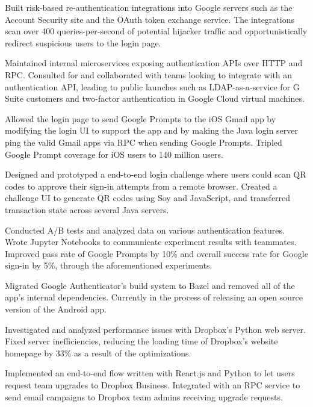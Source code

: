 \documentclass[]{template}
\begin{document}
\hfill
{}
\begin{tightemize}
\item
  Built risk-based re-authentication integrations into Google servers such as
  the Account Security site and the OAuth token exchange service. The
  integrations scan over 400 queries-per-second of potential hijacker traffic
  and opportunistically redirect suspicious users to the login page.
\item
  Maintained internal microservices exposing authentication APIs over HTTP and
  RPC. Consulted for and collaborated with teams looking to integrate with an
  authentication API, leading to public launches such as LDAP-as-a-service for
  G Suite customers and two-factor authentication in Google Cloud virtual
  machines.
\item
  Allowed the login page to send Google Prompts to the iOS Gmail app by
  modifying the login UI to support the app and by making the Java login server
  ping the valid Gmail apps via RPC when sending Google Prompts. Tripled Google
  Prompt coverage for iOS users to 140 million users.
\item
  Designed and prototyped a end-to-end login challenge where users could scan QR
  codes to approve their sign-in attempts from a remote browser. Created a
  challenge UI to generate QR codes using Soy and JavaScript, and transferred
  transaction state across several Java servers.
\item
  Conducted A/B tests and analyzed data on various authentication features.
  Wrote Jupyter Notebooks to communicate experiment results with teammates.
  Improved pass rate of Google Prompts by 10\% and overall success rate for
  Google sign-in by 5\%, through the aforementioned experiments.
\item
  Migrated Google Authenticator's build system to Bazel and removed all of the
  app's internal dependencies. Currently in the process of releasing an open
  source version of the Android app.
\end{tightemize}

\sectionsep

\hfill
{}
\begin{tightemize}
\item
  Investigated and analyzed performance issues with Dropbox's Python web server.
  Fixed server inefficiencies, reducing the loading time of Dropbox's
  website homepage by 33\% as a result of the optimizations.
\item
  Implemented an end-to-end flow written with React.js and Python to let users
  request team upgrades to Dropbox Business. Integrated with an RPC service to
  send email campaigns to Dropbox team admins receiving upgrade requests.
\end{tightemize}
\end{document}
